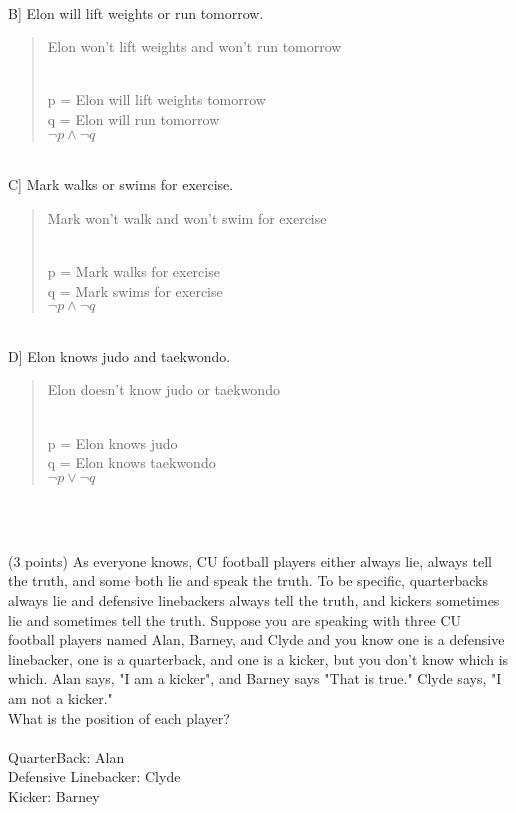 \documentclass[9pt]{article}
\begin{document}
\\
B] Elon will lift weights or run tomorrow.\\
\begin{quote}
	Elon won't lift weights and won't run tomorrow
	
	\\
	
	p = Elon will lift weights tomorrow\\ 
	q = Elon will run tomorrow \\
	$\lnot p \land \lnot q $\\ 
	
\end{quote}


\\
C] Mark walks or swims for exercise.\\
\begin{quote}
	Mark won't walk and won't swim for exercise
	
	\\
	
	p = Mark walks for exercise \\
	q = Mark swims for exercise\\
	$\lnot p  \land \lnot q$
	
\end{quote}
\\
D] Elon knows judo and taekwondo.\\
\begin{quote}
	Elon doesn't know judo or taekwondo
	
	\\
	
	p = Elon knows judo \\ 
	q = Elon knows taekwondo\\
	$\lnot p \lor \lnot q $\\ 
	
\end{quote}
\\
\\
\vspace{10mm}
\newpage
\vspace{5mm}
\item (3 points) As everyone knows, CU football players either always lie, always
tell the truth, and some both lie and speak the truth. To be specific, quarterbacks
always lie and defensive linebackers always tell the truth, and kickers sometimes
lie and sometimes tell the truth. Suppose you are speaking with three CU football
players named Alan, Barney, and Clyde and you know one is a defensive linebacker,
one is a quarterback, and one is a kicker, but you don't know which is which. Alan
says, "I am a kicker", and Barney says "That is true." Clyde says, "I am not a
kicker."\\
What is the position of each player?
\\ \\
QuarterBack: Alan\\
Defensive Linebacker: Clyde\\
Kicker: Barney\\
\end{document}

